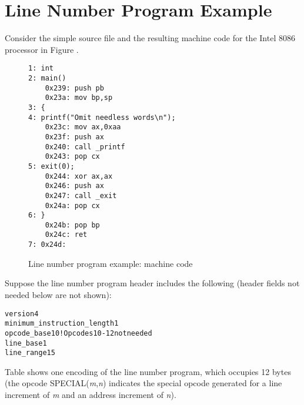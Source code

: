 \clearpage
\section{Line Number Program Example}
\label{app:linenumberprogramexample}

Consider the simple source file and the resulting machine
code for the Intel 8086 processor in 
Figure .

\begin{figure}[here]
\begin{lstlisting}
1: int
2: main()
    0x239: push pb
    0x23a: mov bp,sp
3: {
4: printf("Omit needless words\n");
    0x23c: mov ax,0xaa
    0x23f: push ax
    0x240: call _printf
    0x243: pop cx
5: exit(0);
    0x244: xor ax,ax
    0x246: push ax
    0x247: call _exit
    0x24a: pop cx
6: }
    0x24b: pop bp
    0x24c: ret
7: 0x24d:
\end{lstlisting}
\caption{Line number program example: machine code}
\label{fig:linenumberprogramexamplemachinecode}
\end{figure}

Suppose the line number program header includes the following
(header fields not needed 
below 
are 
not 
shown):
\begin{alltt}
    version                       4
    minimum_instruction_length    1
    opcode_base                  10   ! Opcodes 10-12 not needed
    line_base                     1
    line_range                   15
\end{alltt}


Table 
shows one encoding of the line number program, which occupies
12 bytes (the opcode SPECIAL(\textit{m},\textit{n}) indicates the special opcode
generated for a line increment of \textit{m} and an address increment
of \textit{n}).

